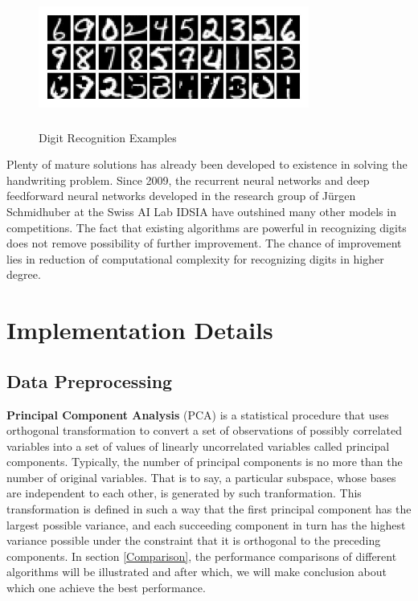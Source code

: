 \documentclass{article} %
\begin{document}
\begin{figure}[h]
    \centering
    \includegraphics[width=3.5in,height=1.5in]{./857453.jpg}\\
    \caption{Digit Recognition Examples}
\end{figure}

Plenty of mature solutions has already been developed to existence in solving
the handwriting problem. 
Since 2009, the recurrent neural networks and deep feedforward neural networks
developed in the research group of Jürgen Schmidhuber at the Swiss AI Lab
IDSIA have outshined many other models in competitions.
The fact that existing algorithms are powerful in recognizing digits does not
remove possibility of further improvement. The chance of improvement lies in
reduction of computational complexity for recognizing digits in higher degree.

\section{Implementation Details} \label{Details}
\subsection{Data Preprocessing} 
{\bf Principal Component Analysis} (PCA) is a statistical procedure that uses
orthogonal transformation to convert a set of observations of possibly
correlated variables into a set of values of linearly uncorrelated variables
called principal components. Typically, the number of principal components is
no more than the number of original variables. That is to say, a particular
subspace, whose bases are independent to each other, is generated by such
tranformation. This transformation is defined in such a way that the first
principal component has the largest possible variance, and each succeeding
component in turn has the highest variance possible under the constraint that
it is orthogonal to the preceding components. In section \ref{Comparison}, the
performance comparisons of different algorithms will be illustrated and after
which, we will make conclusion about which one achieve the best performance. 
\end{document}
